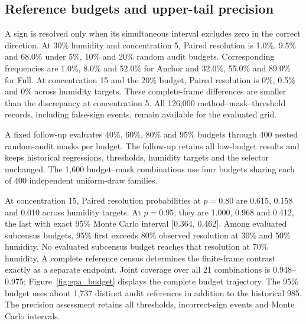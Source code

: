 \subsection{Reference budgets and upper-tail precision}
A sign is resolved only when its simultaneous interval excludes zero in the correct direction.
At $30\%$ humidity and concentration 5, Paired resolution is 1.0\%, 9.5\% and 68.0\% under 5\%, 10\% and 20\% random audit budgets.
Corresponding frequencies are 1.0\%, 8.0\% and 52.0\% for Anchor and 32.0\%, 55.0\% and 89.0\% for Full.
At concentration 15 and the 20\% budget, Paired resolution is 0\%, 0.5\% and 0\% across humidity targets.
These complete-frame differences are smaller than the discrepancy at concentration 5.
All 126,000 method--mask--threshold records, including false-sign events, remain available for the evaluated grid.



A fixed follow-up evaluates 40\%, 60\%, 80\% and 95\% budgets through 400 nested random-audit masks per budget.
The follow-up retains all low-budget results and keeps historical regressions, thresholds, humidity targets and the selector unchanged.
The 1,600 budget--mask combinations use four budgets sharing each of 400 independent uniform-draw families.

At concentration 15, Paired resolution probabilities at $p=0.80$ are 0.615, 0.158 and 0.010 across humidity targets.
At $p=0.95$, they are 1.000, 0.968 and 0.412, the last with exact 95\% Monte Carlo interval [0.364, 0.462].
Among evaluated subcensus budgets, 95\% first exceeds 80\% observed resolution at 30\% and 50\% humidity.
No evaluated subcensus budget reaches that resolution at 70\% humidity.
A complete reference census determines the finite-frame contrast exactly as a separate endpoint.
Joint coverage over all 21 combinations is 0.948--0.975; Figure~\ref{fig:epa_budget} displays the complete budget trajectory.
The 95\% budget uses about 1,737 distinct audit references in addition to the historical 985.
The precision assessment retains all thresholds, incorrect-sign events and Monte Carlo intervals.
